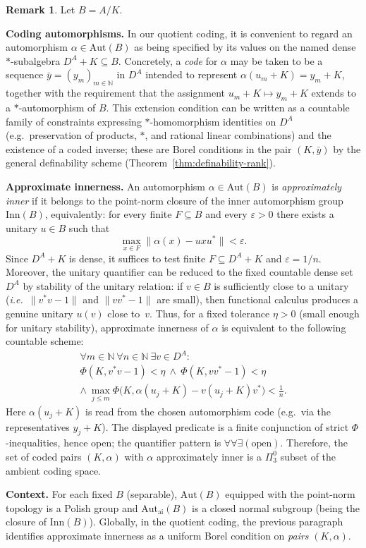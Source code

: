 \documentclass[12pt,fleqn,a4paper]{amsart}
\renewcommand{\le}{\leqslant}
\numberwithin{equation}{section}
\theoremstyle{definition}
\newtheorem{remark}[theorem]{Remark}
\newcommand{\N}{\mathbb{N}}
\newcommand{\Aut}{\mathrm{Aut}}
\newcommand{\Inn}{\mathrm{Inn}}
\begin{document}
\begin{remark}\label{rem:AI-auto}
Let $B=A/K$.

\smallskip\noindent
\textbf{Coding automorphisms.}
In our quotient coding, it is convenient to regard an automorphism $\alpha\in\Aut(B)$
as being specified by its values on the named dense $*$-subalgebra $D^A+K\subseteq B$.
Concretely, a \emph{code} for $\alpha$ may be taken to be a sequence
$\bar y=(y_m)_{m\in\N}$ in $D^A$ intended to represent $\alpha(u_m+K)=y_m+K$,
together with the requirement that the assignment $u_m+K\mapsto y_m+K$ extends to a
$*$-automorphism of $B$.
This extension condition can be written as a countable family of constraints
expressing $*$-homomorphism identities on $D^A$ (e.g.\ preservation of products,
$*$, and rational linear combinations) and the existence of a coded inverse; these
are Borel conditions in the pair $(K,\bar y)$ by the general definability scheme
(Theorem~\ref{thm:definability-rank}).

\smallskip\noindent
\textbf{Approximate innerness.}
An automorphism $\alpha\in\Aut(B)$ is \emph{approximately inner} if it belongs to the
point-norm closure of the inner automorphism group $\Inn(B)$, equivalently:
for every finite $F\subseteq B$ and every $\varepsilon>0$ there exists a unitary
$u\in B$ such that
\[
\max_{x\in F}\|\alpha(x)-uxu^*\|<\varepsilon.
\]
Since $D^A+K$ is dense, it suffices to test finite $F\subseteq D^A+K$ and
$\varepsilon=1/n$.
Moreover, the unitary quantifier can be reduced to the fixed countable dense set
$D^A$ by stability of the unitary relation:
if $v\in B$ is sufficiently close to a unitary (\emph{i.e.}\ $\|v^*v-1\|$ and $\|vv^*-1\|$
are small), then functional calculus produces a genuine unitary $u(v)$ close to~$v$.
Thus, for a fixed tolerance $\eta>0$ (small enough for unitary stability),
approximate innerness of $\alpha$ is equivalent to the following countable scheme:
\begin{multline*}
\forall m\in\N\ \forall n\in\N\ \exists v\in D^A:\\ 
\Phi(K,v^*v-1)<\eta\ \wedge\ \Phi(K,vv^*-1)<\eta\\
\wedge\ 
\max_{j\le m}\Phi\!\bigl(K,\alpha(u_j+K)-v(u_j+K)v^*\bigr)<\tfrac{1}{n}.
\end{multline*}
Here $\alpha(u_j+K)$ is read from the chosen automorphism code (e.g.\ via the
representatives $y_j+K$).
The displayed predicate is a finite conjunction of strict $\Phi$-inequalities, hence
open; the quantifier pattern is $\forall\forall\exists(\text{open})$.
Therefore, the set of coded pairs $(K,\alpha)$ with $\alpha$ approximately inner is
a $\Pi^0_3$ subset of the ambient coding space.

\smallskip\noindent
\textbf{Context.}
For each fixed $B$ (separable), $\Aut(B)$ equipped with the point-norm topology is a
Polish group and $\Aut_{\mathrm{ai}}(B)$ is a closed normal subgroup (being the
closure of $\Inn(B)$).  Globally, in the quotient coding, the previous paragraph
identifies approximate innerness as a uniform Borel condition on \emph{pairs}
$(K,\alpha)$.
\end{remark}
\end{document}

